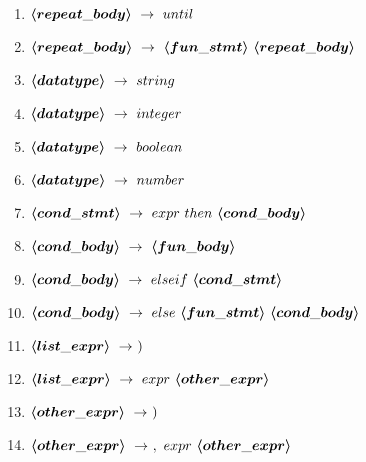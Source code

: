 \begin{enumerate}
	\item $\mbox{\boldmath$\langle{}repeat\_body\rangle{}$}\ \rightarrow\ until$
	\item $\mbox{\boldmath$\langle{}repeat\_body\rangle{}$}\ \rightarrow\ \mbox{\boldmath$\langle{}fun\_stmt\rangle{}$}\ \mbox{\boldmath$\langle{}repeat\_body\rangle{}$}$
	\item $\mbox{\boldmath$\langle{}datatype\rangle{}$}\ \rightarrow\ string$
	\item $\mbox{\boldmath$\langle{}datatype\rangle{}$}\ \rightarrow\ integer$
	\item $\mbox{\boldmath$\langle{}datatype\rangle{}$}\ \rightarrow\ boolean$
	\item $\mbox{\boldmath$\langle{}datatype\rangle{}$}\ \rightarrow\ number$
	\item $\mbox{\boldmath$\langle{}cond\_stmt\rangle{}$}\ \rightarrow\ expr\ then\ \mbox{\boldmath$\langle{}cond\_body\rangle{}$}$
	\item $\mbox{\boldmath$\langle{}cond\_body\rangle{}$}\ \rightarrow\ \mbox{\boldmath$\langle{}fun\_body\rangle{}$}$
	\item $\mbox{\boldmath$\langle{}cond\_body\rangle{}$}\ \rightarrow\ elseif\ \mbox{\boldmath$\langle{}cond\_stmt\rangle{}$}$
	\item $\mbox{\boldmath$\langle{}cond\_body\rangle{}$}\ \rightarrow\ else\ \mbox{\boldmath$\langle{}fun\_stmt\rangle{}$}\ \mbox{\boldmath$\langle{}cond\_body\rangle{}$}$
	\item $\mbox{\boldmath$\langle{}list\_expr\rangle{}$}\ \rightarrow\ )$
	\item $\mbox{\boldmath$\langle{}list\_expr\rangle{}$}\ \rightarrow\ expr\ \mbox{\boldmath$\langle{}other\_expr\rangle{}$}$
	\item $\mbox{\boldmath$\langle{}other\_expr\rangle{}$}\ \rightarrow\ )$
	\item $\mbox{\boldmath$\langle{}other\_expr\rangle{}$}\ \rightarrow\ ,\ expr\ \mbox{\boldmath$\langle{}other\_expr\rangle{}$}$
\end{enumerate}

